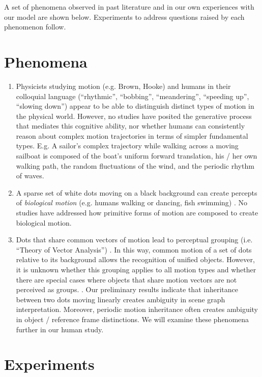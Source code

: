 \documentclass{scrartcl}
\begin{document}
A set of phenomena observed in past literature and in our own experiences with our model are shown below. Experiments to address questions raised by each phenomenon follow.

\section{Phenomena} \label{Phenomena}

\begin{enumerate}
  \item \label{motion_alone_phen}
  Physicists studying motion (e.g. Brown, Hooke) and humans in their colloquial language (``rhythmic'', ``bobbing'', ``meandering'', ``speeding up'', ``slowing down'') appear to be able to distinguish distinct types of motion in the physical world. However, no studies have posited the generative process that mediates this cognitive ability, nor whether humans can consistently reason about complex motion trajectories in terms of simpler fundamental types. E.g. A sailor's complex trajectory while walking across a moving sailboat is composed of the boat's uniform forward translation, his / her own walking path, the random fluctuations of the wind, and the periodic rhythm of waves. 
  \item \label{biomotion_phen} A sparse set of white dots moving on a black background can create percepts of \emph{biological motion} (e.g. humans walking or dancing, fish swimming) \cite{Johansson_1973}. No studies have addressed how primitive forms of motion are composed to create biological motion. 
  \item Dots that share common vectors of motion lead to perceptual grouping (i.e. ``Theory of Vector Analysis'') \cite{Johansson_1973}. In this way, common motion of a set of dots relative to its background allows the recognition of unified objects. However, it is unknown whether this grouping applies to all motion types and whether there are special cases where objects that share motion vectors are not perceived as groups. \label{common_motion_phen}. Our preliminary results indicate that inheritance between two dots moving linearly creates ambiguity in scene graph interpretation. Moreover, periodic motion inheritance often creates ambiguity in object / reference frame distinctions. We will examine these phenomena further in our human study. 
\end{enumerate}


\section{Experiments}
\end{document}
